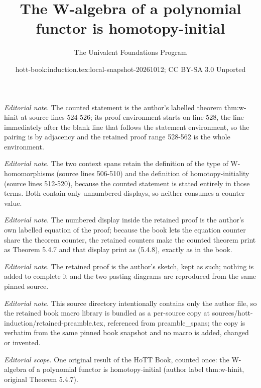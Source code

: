 \documentclass[10pt,a4paper]{article}
\title{The W-algebra of a polynomial functor is homotopy-initial}
\author{The Univalent Foundations Program}
\date{hott-book:induction.tex:local-snapshot-20261012; CC BY-SA 3.0 Unported}
\newcounter{chapter}
\theoremstyle{definition}
\theoremstyle{remark}
\numberwithin{equation}{section}
\begin{document}
\maketitle
\setcounter{chapter}{5}
\setcounter{section}{4}
\setcounter{thm}{6}
\noindent\textit{Editorial note.} The counted statement is the author's labelled theorem thm:w-hinit at source lines 524-526; its proof environment starts on line 528, the line immediately after the blank line that follows the statement environment, so the pairing is by adjacency and the retained proof range 528-562 is the whole environment.\par\medskip
\noindent\textit{Editorial note.} The two context spans retain the definition of the type of W-homomorphisms (source lines 506-510) and the definition of homotopy-initiality (source lines 512-520), because the counted statement is stated entirely in those terms. Both contain only unnumbered displays, so neither consumes a counter value.\par\medskip
\noindent\textit{Editorial note.} The numbered display inside the retained proof is the author's own labelled equation of the proof; because the book lets the equation counter share the theorem counter, the retained counters make the counted theorem print as Theorem 5.4.7 and that display print as (5.4.8), exactly as in the book.\par\medskip
\noindent\textit{Editorial note.} The retained proof is the author's sketch, kept as such; nothing is added to complete it and the two pasting diagrams are reproduced from the same pinned source.\par\medskip
\noindent\textit{Editorial note.} This source directory intentionally contains only the author file, so the retained book macro library is bundled as a per-source copy at sources/hott-induction/retained-preamble.tex, referenced from preamble\_spans; the copy is verbatim from the same pinned book snapshot and no macro is added, changed or invented.\par\medskip
\noindent\textit{Editorial scope.} One original result of the HoTT Book, counted once: the W-algebra of a polynomial functor is homotopy-initial (author label thm:w-hinit, original Theorem 5.4.7).\par\medskip
\end{document}
